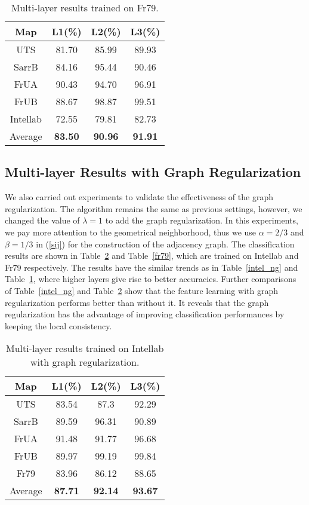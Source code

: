 \documentclass[letterpaper, 10 pt, conference]{ieeeconf}  %
\begin{document}
\begin{table}[tpb]
\caption{Multi-layer results trained on Fr79.}
\label{fr79_ng}
\begin{center}
\begin{tabular}{cccc}
Map     &L1(\%)     &L2(\%)     &L3(\%)   \\
\hline
UTS     &81.70 	    &85.99      &89.93\\
SarrB   &84.16 	    &95.44      &90.46\\
FrUA    &90.43 	    &94.70      &96.91\\
FrUB    &88.67      &98.87      &99.51\\
Intellab    &72.55      &79.81      &82.73\\
Average     &\textbf{83.50}      &\textbf{90.96}      &\textbf{91.91}\\
\end{tabular}
\end{center}
\end{table}


\subsection{Multi-layer Results with Graph Regularization}

We also carried out experiments to validate the effectiveness of the graph regularization. The algorithm remains the same as previous settings, however, we changed  the value of  $\lambda=1$ to add the graph regularization. In this experiments, we pay more attention to the geometrical neighborhood, thus we use $\alpha=2/3$ and $\beta=1/3$ in (\ref{sij}) for the construction of the adjacency graph. The classification results are shown in Table~\ref{intel} and Table~\ref{fr79}, which are trained on Intellab and Fr79 respectively. The results have the similar trends as in Table~\ref{intel_ng} and Table~\ref{fr79_ng}, where higher layers give rise to better accuracies.  Further comparisons of Table~\ref{intel_ng} and Table~\ref{intel} show that the feature learning with graph regularization performs better than without it. It reveals that the graph regularization has the advantage of improving classification performances by keeping the local consistency.

\begin{table}[pb]
\caption{Multi-layer results trained on Intellab with graph regularization.}
\label{intel}
\begin{center}
\begin{tabular}{cccc}
Map     &L1(\%)     &L2(\%)     &L3(\%)   \\
\hline
UTS     &83.54	    &87.3	    &92.29\\
SarrB   &89.59	    &96.31      &90.89\\
FrUA    &91.48	    &91.77	    &96.68\\
FrUB    &89.97	    &99.19	    &99.84\\
Fr79    &83.96	    &86.12	    &88.65\\
Average     &\textbf{87.71}	    &\textbf{92.14}	    &\textbf{93.67}\\
\end{tabular}
\end{center}
\end{table}
\end{document}
